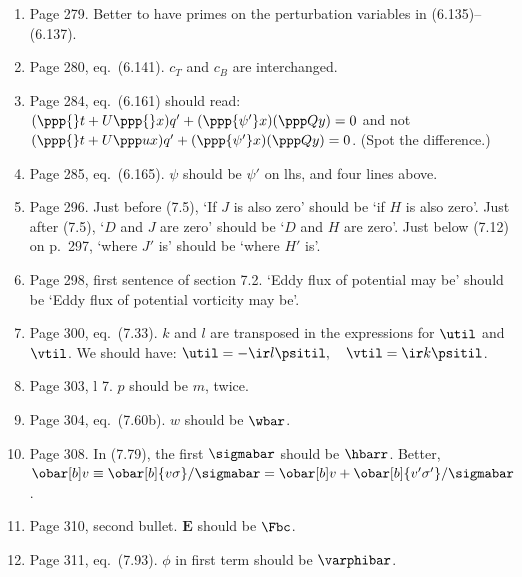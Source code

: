 \documentclass[10pt]{article}
\newcommand{\eq}{eq.\ } \newcommand{\Eq}{Eq.\ }
\begin{document}
\begin{enumerate}

\item Page 279. Better to have primes on the perturbation variables in (6.135)--(6.137).

\item Page 280, \eq (6.141). $c_T$ and $c_B$ are interchanged.


\item Page 284, \eq (6.161) should read: $(\ppp{}t + U \ppp {}  x) q' + (\ppp{\psi'} x)( \ppp Q y) = 0 $ and not $(\ppp{}t + U \ppp u x) q' + (\ppp{\psi'}x) ( \ppp Q y )= 0 $. (Spot the difference.)

\item Page 285, \eq (6.165). $\psi$ should be $\psi'$ on lhs, and four lines above.

\item Page 296. Just before (7.5), `If $J$ is also zero' should be `if $H$ is also zero'. Just after (7.5), `$D$ and $J$ are zero' should be `$D$ and $H$ are zero'. Just below (7.12) on p.\ 297, `where $J'$ is' should be `where $H'$ is'.

\item Page 298, first sentence of section 7.2. `Eddy flux of potential may be' should be `Eddy flux of potential vorticity may be'.

\item Page 300, \eq (7.33). $k$ and $l$ are transposed in the expressions for $\util$ and $\vtil$. We should have:
     $  \util  =  - \ir l \psitil,  \quad \vtil = \ir k \psitil$.

\item Page 303, l 7. $p$ should be $m$, twice.

\item Page 304, \eq (7.60b). $w$ should be $\wbar$.

\item Page 308. In (7.79), the first $\sigmabar$ should be $\hbarr$. Better,
$\obar[b]v \equiv  \obar[b]{v \sigma}/\sigmabar =  \obar[b] v + \obar[b]{v'\sigma'} /\sigmabar  $.

\item Page 310, second bullet. $\bm E$ should be $\Fbc$.

\item Page 311, \eq (7.93). $\phi$ in first term should be $\varphibar$.


\end{enumerate}
\end{document}
